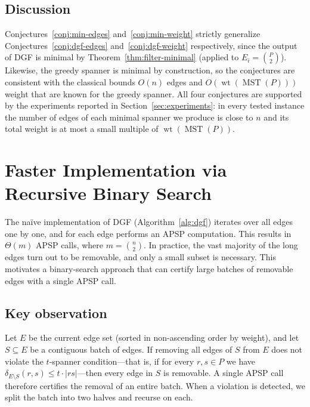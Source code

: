 \documentclass{article}
\DeclareMathOperator{\wt}{wt}
\DeclareMathOperator{\MST}{MST}
\begin{document}
\subsection{Discussion}
Conjectures~\ref{conj:min-edges} and~\ref{conj:min-weight} strictly
generalize Conjectures~\ref{conj:dgf-edges} and~\ref{conj:dgf-weight}
respectively, since the output of DGF is minimal by
Theorem~\ref{thm:filter-minimal} (applied to $E_i=\binom{P}{2}$).
Likewise, the greedy spanner is minimal by construction, so the
conjectures are consistent with the classical bounds $O(n)$ edges
and $O(\wt(\MST(P)))$ weight that are known for the greedy spanner.
All four conjectures are supported by the experiments reported in
Section~\ref{sec:experiments}: in every tested instance the number of
edges of each minimal spanner we produce is close to $n$ and its
total weight is at most a small multiple of $\wt(\MST(P))$.

\newpage

\section{Faster Implementation via Recursive Binary Search}
\label{sec:binary-search}

The na\"ive implementation of DGF (Algorithm~\ref{alg:dgf}) iterates
over all edges one by one, and for each edge performs an APSP
computation. This results in $\Theta(m)$ APSP calls, where
$m=\binom{n}{2}$. In practice, the vast majority of the long edges turn
out to be removable, and only a small subset is necessary. This
motivates a binary-search approach that can certify large batches of
removable edges with a single APSP call.

\subsection{Key observation}
Let $E$ be the current edge set (sorted in non-ascending order by
weight), and let $S \subseteq E$ be a contiguous batch of edges. If
removing all edges of $S$ from $E$ does not violate the $t$-spanner
condition---that is, if for every $r,s\in P$ we have
$\delta_{E\setminus S}(r,s) \le t\cdot|rs|$---then every edge in $S$
is removable. A single APSP call therefore certifies the removal of an
entire batch. When a violation is detected, we split the batch into two
halves and recurse on each.
\end{document}
